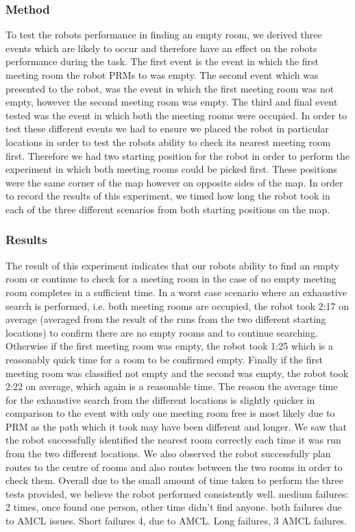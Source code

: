 \documentclass[conference]{IEEEtran}
\begin{document}
\subsubsection{Method}
To test the robots performance in finding an empty room, we derived three events which are likely to occur and therefore have an effect on the robots performance during the task. The first event is the event in which the first meeting room the robot PRMs to was empty. The second event which was presented to the robot, was the event in which the first meeting room was not empty, however the second meeting room was empty. The third and final event tested was the event in which both the meeting rooms were occupied. In order to test these different events we had to ensure we placed the robot in particular locations in order to test the robots ability to check its nearest meeting room first. Therefore we had two starting position for the robot in order to perform the experiment in which both meeting rooms could be picked first. These positions were the same corner of the map however on opposite sides of the map. In order to record the results of this experiment, we timed how long the robot took in each of the three different scenarios from both starting positions on the map.
\subsubsection{Results}
The result of this experiment indicates that our robots ability to find an empty room or continue to check for a meeting room in the case of no empty meeting room completes in a sufficient time. In a worst case scenario where an exhaustive search is performed, i.e. both meeting rooms are occupied, the robot took 2:17 on average (averaged from the result of the runs from the two different starting locations) to confirm there are no empty rooms and to continue searching. Otherwise if the first meeting room was empty, the robot took 1:25 which is a reasonably quick time for a room to be confirmed empty. Finally if the first meeting room was classified not empty and the second was empty, the robot took 2:22 on average, which again is a reasonable time. The reason the average time for the exhaustive search from the different locations is slightly quicker in comparison to the event with only one meeting room free is most likely due to PRM as the path which it took may have been different and longer. We saw that the robot successfully identified the nearest room correctly each time it was run from the two different locations. We also observed the robot successfully plan routes to the centre of rooms and also routes between the two rooms in order to check them. Overall due to the small amount of time taken to perform the three tests provided, we believe the robot performed consistently well.
medium failures: 2 times, once found one person, other time didn't find anyone. both failures due to AMCL issues. Short failures 4, due to AMCL. Long failures, 3 AMCL failures.
\end{document}
